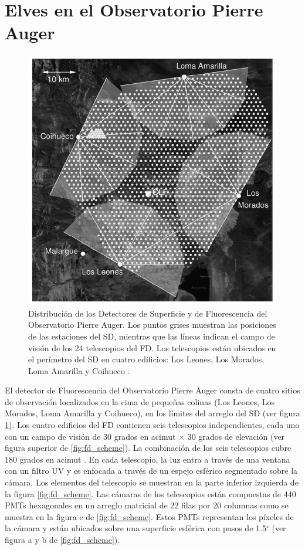 \documentclass[12pt,oneside,openany,letter]{book}
\begin{document}
\section{Elves en el Observatorio Pierre Auger}
\begin{figure}
    \centering
    \includegraphics[scale=0.5]{figures/auger_sites.png}
    \caption[Distribuci\'on de los Detectores de Superficie y Fluorescencia del Observatorio Pierre Auger.]{Distribuci\'on de los Detectores de Superficie y de Fluorescencia del Observatorio Pierre Auger. Los puntos grises muestran las posiciones de las estaciones del SD, mientras que las l\'ineas indican el campo de visi\'on de los 24 telescopios del FD. Los telescopios est\'an ubicados en el per\'imetro del SD en cuatro edificios: Los Leones, Los Morados, Loma Amarilla y Coihueco \cite{AbrahamEtal2010}. }
    \label{fig:auger_sites}
\end{figure}
El detector de Fluorescencia del Observatorio Pierre Auger consta de cuatro sitios de observaci\'on localizados en la cima de pequeñas colinas (Los Leones, Los Morados, Loma Amarilla y Coihueco), en los límites del arreglo del SD (ver figura \ref{fig:auger_sites}). Los cuatro edificios del FD contienen seis telescopios independientes, cada uno con un campo de visión de 30 grados en acimut $\times$ 30 grados de elevación (ver figura superior de \ref{fig:fd_scheme}). La combinación de los seis telescopios cubre 180 grados en acimut \cite{AbrahamEtal2010}. En cada telescopio, la luz entra a través de una ventana con un filtro UV y es enfocada a través de un espejo esférico segmentado sobre la cámara. Los elementos del telescopio se muestran en la parte inferior izquierda de la figura \ref{fig:fd_scheme}. Las c\'amaras de los telescopios est\'an compuestas de 440 PMTs hexagonales en un arreglo matricial de 22 filas por 20 columnas como se muestra en la figura c de \ref{fig:fd_scheme}. Estos PMTs representan los p\'ixeles de la c\'amara y est\'an ubicados sobre una superficie esf\'erica con pasos de 1.5$^\circ$ \cite{AbrahamEtal2010} (ver figura a y b de \ref{fig:fd_scheme}). 
\end{document}

